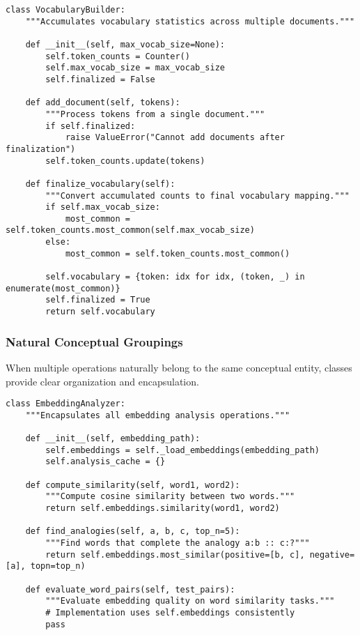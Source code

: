 \documentclass[11pt,a4paper]{article}
\begin{document}
\begin{lstlisting}[caption=Appropriate use of classes for stateful entities]
class VocabularyBuilder:
    """Accumulates vocabulary statistics across multiple documents."""
    
    def __init__(self, max_vocab_size=None):
        self.token_counts = Counter()
        self.max_vocab_size = max_vocab_size
        self.finalized = False
    
    def add_document(self, tokens):
        """Process tokens from a single document."""
        if self.finalized:
            raise ValueError("Cannot add documents after finalization")
        self.token_counts.update(tokens)
    
    def finalize_vocabulary(self):
        """Convert accumulated counts to final vocabulary mapping."""
        if self.max_vocab_size:
            most_common = self.token_counts.most_common(self.max_vocab_size)
        else:
            most_common = self.token_counts.most_common()
        
        self.vocabulary = {token: idx for idx, (token, _) in enumerate(most_common)}
        self.finalized = True
        return self.vocabulary
\end{lstlisting}

\subsubsection{Natural Conceptual Groupings}

When multiple operations naturally belong to the same conceptual entity, classes provide clear organization and encapsulation.

\begin{lstlisting}[caption=Classes for conceptual groupings]
class EmbeddingAnalyzer:
    """Encapsulates all embedding analysis operations."""
    
    def __init__(self, embedding_path):
        self.embeddings = self._load_embeddings(embedding_path)
        self.analysis_cache = {}
    
    def compute_similarity(self, word1, word2):
        """Compute cosine similarity between two words."""
        return self.embeddings.similarity(word1, word2)
    
    def find_analogies(self, a, b, c, top_n=5):
        """Find words that complete the analogy a:b :: c:?"""
        return self.embeddings.most_similar(positive=[b, c], negative=[a], topn=top_n)
    
    def evaluate_word_pairs(self, test_pairs):
        """Evaluate embedding quality on word similarity tasks."""
        # Implementation uses self.embeddings consistently
        pass
\end{lstlisting}
\end{document}
